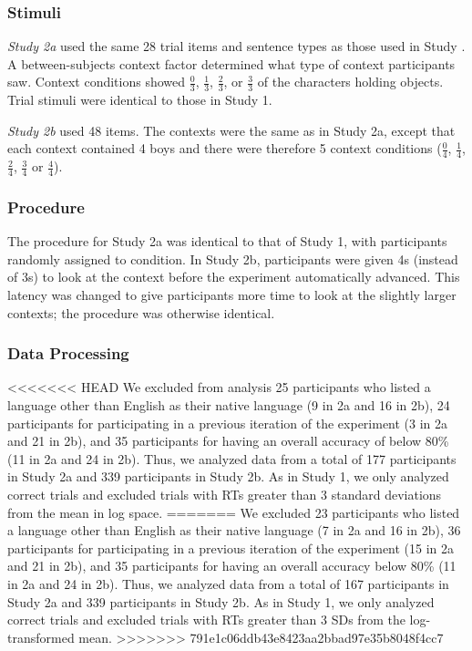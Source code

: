\documentclass[10pt,letterpaper]{article}
\begin{document}
\subsubsection{Stimuli}

\emph{Study 2a} used the same 28 trial items and sentence types as those used in Study .  A between-subjects context factor determined what type of context participants saw.  Context conditions showed $\frac{0}{3}$, $\frac{1}{3}$, $\frac{2}{3}$, or $\frac{3}{3}$ of the characters holding objects.  Trial stimuli were identical to those in Study 1.  

\emph{Study 2b} used 48 items.  The contexts were the same as in Study 2a, except that each context contained 4 boys and there were therefore 5 context conditions ($\frac{0}{4}$, $\frac{1}{4}$, $\frac{2}{4}$, $\frac{3}{4}$ or $\frac{4}{4}$).  

\subsubsection{Procedure}
 The procedure for Study 2a was identical to that of Study 1, with participants randomly assigned to condition.   In Study 2b, participants were given 4s (instead of 3s) to look at the context before the experiment automatically advanced.  This latency was changed to give participants more time to look at the slightly larger contexts; the procedure was otherwise identical.
 
 \subsubsection{Data Processing}

<<<<<<< HEAD
We excluded from analysis 25 participants who listed a language other than English as their native language (9 in 2a and 16 in 2b), 24 participants for participating in a previous iteration of the experiment (3 in 2a and 21 in 2b), and 35 participants for having an overall accuracy of below 80\% (11 in 2a and 24 in 2b).  Thus, we analyzed data from a total of 177 participants in Study 2a and 339 participants in Study 2b. As in Study 1, we only analyzed correct trials and excluded trials with RTs greater than 3 standard deviations from the mean in log space.  
=======
We excluded 23 participants who listed a language other than English as their native language (7 in 2a and 16 in 2b), 36 participants for participating in a previous iteration of the experiment (15 in 2a and 21 in 2b), and 35 participants for having an overall accuracy below 80\% (11 in 2a and 24 in 2b).  Thus, we analyzed data from a total of 167 participants in Study 2a and 339 participants in Study 2b. As in Study 1, we only analyzed correct trials and excluded trials with RTs greater than 3 SDs from the log-transformed mean. 
>>>>>>> 791e1c06ddb43e8423aa2bbad97e35b8048f4cc7
\end{document}
